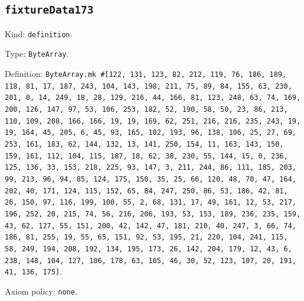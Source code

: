 \documentclass[11pt]{article}
\begin{document}
\subsection*{\texttt{fixtureData173}}
\noindent Kind: \texttt{definition}.\par
\noindent Type: \texttt{ByteArray}.\par
\noindent Definition: \texttt{ByteArray.mk \#[122, 131, 123, 82, 212, 119, 76, 186, 189, 118, 81, 17, 187, 243, 104, 143, 198, 211, 75, 89, 84, 155, 63, 230, 201, 0, 14, 249, 18, 28, 129, 216, 44, 166, 81, 123, 248, 63, 74, 169, 200, 126, 147, 97, 53, 106, 253, 182, 52, 190, 58, 50, 23, 86, 213, 110, 109, 208, 166, 166, 19, 19, 169, 62, 251, 216, 216, 235, 243, 19, 19, 164, 45, 205, 6, 45, 93, 165, 102, 193, 96, 138, 106, 25, 27, 69, 253, 161, 183, 62, 144, 132, 13, 141, 250, 154, 11, 163, 143, 150, 159, 161, 112, 104, 115, 187, 18, 62, 38, 230, 55, 144, 15, 0, 236, 125, 136, 33, 153, 218, 225, 93, 147, 3, 211, 244, 86, 111, 185, 203, 99, 213, 96, 94, 85, 124, 175, 150, 35, 25, 66, 120, 48, 70, 47, 164, 202, 40, 171, 124, 115, 152, 65, 84, 247, 250, 86, 53, 186, 42, 81, 26, 150, 97, 116, 199, 100, 55, 2, 68, 131, 17, 49, 161, 12, 53, 217, 196, 252, 20, 215, 74, 56, 216, 206, 193, 53, 153, 189, 236, 235, 159, 43, 62, 127, 55, 151, 200, 42, 142, 47, 181, 210, 40, 247, 3, 66, 74, 186, 81, 255, 19, 55, 65, 151, 92, 53, 195, 21, 220, 104, 241, 115, 58, 249, 194, 208, 192, 134, 195, 173, 26, 142, 204, 179, 12, 43, 6, 238, 148, 104, 127, 106, 178, 63, 105, 46, 30, 52, 123, 107, 20, 191, 41, 136, 175]}.\par
\noindent Axiom policy: \texttt{none}.\par
\end{document}
